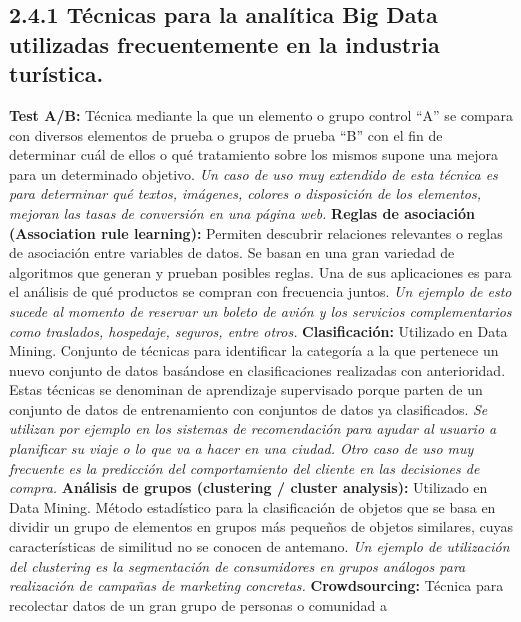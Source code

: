 \documentclass[
  letterpaper,
  DIV=11,
  numbers=noendperiod]{scrreprt}
\begin{document}
\hypertarget{tuxe9cnicas-para-la-analuxedtica-big-data-utilizadas-frecuentemente-en-la-industria-turuxedstica.-1}{%
\subsection{2.4.1 Técnicas para la analítica Big Data utilizadas
frecuentemente en la industria
turística.}\label{tuxe9cnicas-para-la-analuxedtica-big-data-utilizadas-frecuentemente-en-la-industria-turuxedstica.-1}}

\textbf{Test A/B:} Técnica mediante la que un elemento o grupo control
``A'' se compara con diversos elementos de prueba o grupos de prueba
``B'' con el fin de determinar cuál de ellos o qué tratamiento sobre los
mismos supone una mejora para un determinado objetivo. \emph{Un caso de
uso muy extendido de esta técnica es para determinar qué textos,
imágenes, colores o disposición de los elementos, mejoran las tasas de
conversión en una página web.} \textbf{Reglas de asociación (Association
rule learning):} Permiten descubrir relaciones relevantes o reglas de
asociación entre variables de datos. Se basan en una gran variedad de
algoritmos que generan y prueban posibles reglas. Una de sus
aplicaciones es para el análisis de qué productos se compran con
frecuencia juntos. \emph{Un ejemplo de esto sucede al momento de
reservar un boleto de avión y los servicios complementarios como
traslados, hospedaje, seguros, entre otros.} \textbf{Clasificación:}
Utilizado en Data Mining. Conjunto de técnicas para identificar la
categoría a la que pertenece un nuevo conjunto de datos basándose en
clasificaciones realizadas con anterioridad. Estas técnicas se denominan
de aprendizaje supervisado porque parten de un conjunto de datos de
entrenamiento con conjuntos de datos ya clasificados. \emph{Se utilizan
por ejemplo en los sistemas de recomendación para ayudar al usuario a
planificar su viaje o lo que va a hacer en una ciudad. Otro caso de uso
muy frecuente es la predicción del comportamiento del cliente en las
decisiones de compra.} \textbf{Análisis de grupos (clustering / cluster
analysis):} Utilizado en Data Mining. Método estadístico para la
clasificación de objetos que se basa en dividir un grupo de elementos en
grupos más pequeños de objetos similares, cuyas características de
similitud no se conocen de antemano. \emph{Un ejemplo de utilización del
clustering es la segmentación de consumidores en grupos análogos para
realización de campañas de marketing concretas.} \textbf{Crowdsourcing:}
Técnica para recolectar datos de un gran grupo de personas o comunidad a
\end{document}

